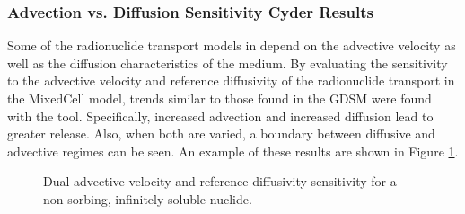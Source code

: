 
\subsubsection{Advection vs. Diffusion Sensitivity Cyder Results}
Some of the  radionuclide transport models in \Cyder depend on the advective velocity as well as the diffusion 
characteristics of the medium. By evaluating the sensitivity to the advective velocity and reference 
diffusivity of the radionuclide transport in the MixedCell model, trends similar to those found in the \gls{GDSM} were found with the \Cyder tool. 
Specifically, increased advection and increased diffusion lead to greater release. Also, when both are varied, a boundary between diffusive and advective
regimes can be seen. An example of these results are shown in Figure \ref{fig:mixed_adv_diff}.
 
\begin{figure}[ht]
\centering
\caption[Advection vs. Diffusion Sensitivity in Cyder]{Dual advective velocity 
and reference diffusivity sensitivity for a non-sorbing, infinitely soluble 
nuclide.}
\label{fig:mixed_adv_diff}
\end{figure}

